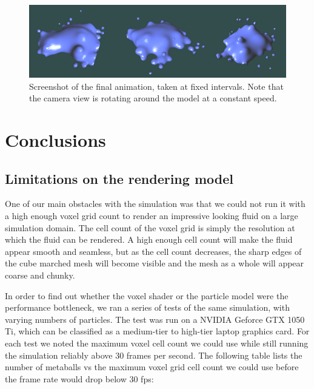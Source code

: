 \documentclass{article}
\begin{document}
\begin{multicols}{2}
        \begin{figure}[H]
        	\begin{minipage}[b]{0.5\textwidth}
	            \includegraphics[width=\linewidth]{img/result-animation.png}
				\caption{Screenshot of the final animation, taken at fixed intervals. Note that the camera view is rotating around the model at a constant speed.}
				\label{fig:result-animation}
        	\end{minipage}
        \end{figure}

    \section{Conclusions}
    
        \subsection{Limitations on the rendering model}
        
        One of our main obstacles with the simulation was that we could not run it with a high enough voxel grid count to render an impressive looking fluid on a large simulation domain.
        The cell count of the voxel grid is simply the resolution at which the fluid can be rendered.
        A high enough cell count will make the fluid appear smooth and seamless, but as the cell count decreases, the sharp edges of the cube marched mesh will become visible and the mesh as a whole will appear coarse and chunky.

        In order to find out whether the voxel shader or the particle model were the performance bottleneck, we ran a series of tests of the same simulation, with varying numbers of particles.
        The test was run on a NVIDIA Geforce GTX 1050 Ti, which can be classified as a medium-tier to high-tier laptop graphics card.
        For each test we noted the maximum voxel cell count we could use while still running the simulation reliably above 30 frames per second.
        The following table lists the number of metaballs vs the maximum voxel grid cell count we could use before the frame rate would drop below 30 fps:


\end{multicols}
\end{document}
